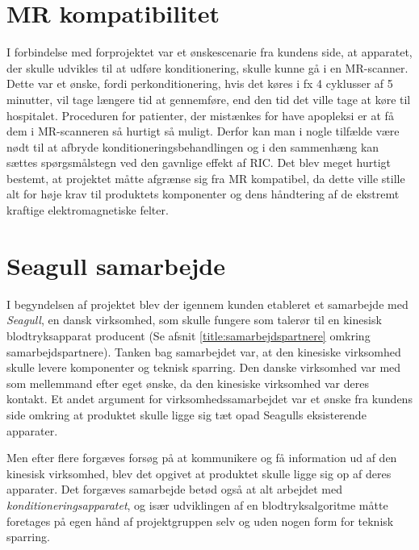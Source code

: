 \section{MR kompatibilitet}
I forbindelse med forprojektet var et ønskescenarie fra kundens side, at apparatet, der skulle udvikles til at udføre konditionering, skulle kunne gå i en MR-scanner. Dette var et ønske, fordi perkonditionering, hvis det køres i fx 4 cyklusser af 5 minutter, vil tage længere tid at gennemføre, end den tid det ville tage at køre til hospitalet. Proceduren for patienter, der mistænkes for have apopleksi er at få dem i MR-scanneren så hurtigt så muligt. Derfor kan man i nogle tilfælde være nødt til at afbryde konditioneringsbehandlingen og i den sammenhæng kan sættes spørgsmålstegn ved den gavnlige effekt af RIC. Det blev meget hurtigt bestemt, at projektet måtte afgrænse sig fra MR kompatibel, da dette ville stille alt for høje krav til produktets komponenter og dens håndtering af de ekstremt kraftige elektromagnetiske felter.

\section{Seagull samarbejde}
I begyndelsen af projektet blev der igennem kunden etableret et samarbejde med \textit{Seagull}, en dansk virksomhed, som skulle fungere som talerør til en kinesisk blodtryksapparat producent (Se afsnit \ref{title:samarbejdspartnere} omkring samarbejdspartnere). Tanken bag samarbejdet var, at den kinesiske virksomhed skulle levere komponenter og teknisk sparring. Den danske virksomhed var med som mellemmand efter eget ønske, da den kinesiske virksomhed var deres kontakt. Et andet argument for virksomhedssamarbejdet var et ønske fra kundens side omkring at produktet skulle ligge sig tæt opad Seagulls eksisterende apparater. 

Men efter flere forgæves forsøg på at kommunikere og få information ud af den kinesisk virksomhed, blev det opgivet at produktet skulle ligge sig op af deres apparater. Det forgæves samarbejde betød også at alt arbejdet med \textit{konditioneringsapparatet}, og især udviklingen af en blodtryksalgoritme måtte foretages på egen hånd af projektgruppen selv og uden nogen form for teknisk sparring. 

